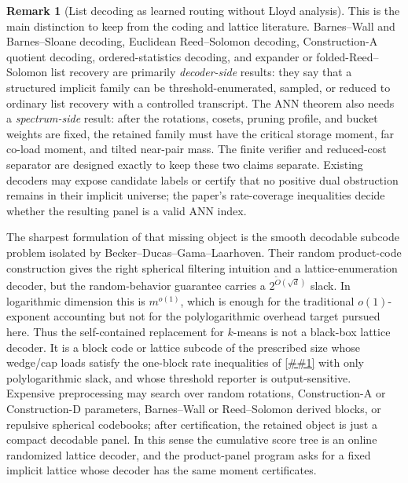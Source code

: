 \documentclass[10pt]{article}
\newcommand{\cref}[1]{\ref{##1}}
\theoremstyle{definition}
\newtheorem{remark}[theorem]{Remark}
\begin{document}
\begin{remark}[List decoding as learned routing without Lloyd analysis]
   This is the main distinction to keep from the coding and lattice
   literature.  Barnes--Wall and Barnes--Sloane decoding, Euclidean
   Reed--Solomon decoding, Construction-A quotient decoding, ordered-statistics
   decoding, and expander or folded-Reed--Solomon list recovery are primarily
   \emph{decoder-side} results: they say that a structured implicit family can
   be threshold-enumerated, sampled, or reduced to ordinary list recovery with a
   controlled transcript.  The ANN theorem also needs a \emph{spectrum-side}
   result: after the rotations, cosets, pruning profile, and bucket weights are
   fixed, the retained family must have the critical storage moment, far
   co-load moment, and tilted near-pair mass.  The finite verifier and
   reduced-cost separator are designed exactly to keep these two claims
   separate.  Existing decoders may expose candidate labels or certify that no
   positive dual obstruction remains in their implicit universe; the paper's
   rate-coverage inequalities decide whether the resulting panel is a valid ANN
   index.

   The sharpest formulation of that missing object is the smooth decodable
   subcode problem isolated by Becker--Ducas--Gama--Laarhoven.  Their random
   product-code construction gives the right spherical filtering intuition and
   a lattice-enumeration decoder, but the random-behavior guarantee carries a
   \(2^{\widetilde O(\sqrt d)}\) slack.  In logarithmic dimension this is
   \(m^{o(1)}\), which is enough for the traditional \(o(1)\)-exponent
   accounting but not for the polylogarithmic overhead target pursued here.
   Thus the self-contained replacement for \(k\)-means is not a black-box
   lattice decoder.  It is a block code or lattice subcode of the prescribed
   size whose wedge/cap loads satisfy the one-block rate inequalities of
   \cref{cor:product-panel-rate-bookkeeping} with only polylogarithmic slack,
   and whose threshold reporter is output-sensitive.  Expensive preprocessing
   may search over random rotations, Construction-A or Construction-D
   parameters, Barnes--Wall or Reed--Solomon derived blocks, or repulsive
   spherical codebooks; after certification, the retained object is just a
   compact decodable panel.  In this sense the cumulative score tree is an
   online randomized lattice decoder, and the product-panel program asks for a
   fixed implicit lattice whose decoder has the same moment certificates.


\end{remark}
\end{document}
